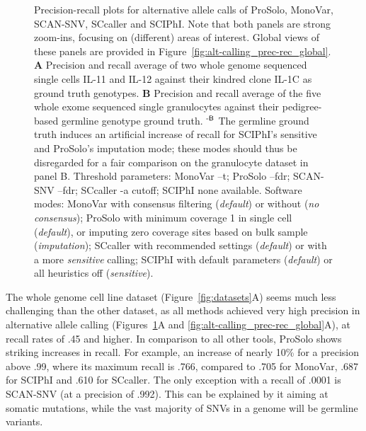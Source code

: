 \documentclass[12pt,inline]{wlscirep}
\begin{document}
\begin{figure}[!tpb]
 \caption{
  Precision-recall plots for alternative allele calls of ProSolo, MonoVar, SCAN-SNV, SCcaller and SCIPhI.
  Note that both panels are strong zoom-ins, focusing on (different) areas of interest.
  Global views of these panels are provided in Figure~\ref{fig:alt-calling_prec-rec_global}.
  \textbf{A} Precision and recall average of two whole genome sequenced single cells IL-11 and IL-12 against their kindred clone IL-1C as ground truth genotypes.
  \textbf{B} Precision and recall average of the five whole exome sequenced single granulocytes against their pedigree-based germline genotype ground truth.\newline
  $^\text{\sffamily-B}$ The germline ground truth induces an artificial increase of recall for SCIPhI's sensitive and ProSolo's imputation mode; these modes should thus be disregarded for a fair comparison on the granulocyte dataset in panel B.\newline \footnotesize
  Threshold parameters:
  MonoVar {\ttfamily --t};
  ProSolo {\ttfamily --fdr};
  SCAN-SNV {\ttfamily --fdr};
  SCcaller {\ttfamily -a cutoff};
  SCIPhI {\ttfamily none available}.
  Software modes:
  MonoVar with consensus filtering ({\itshape default}) or without ({\itshape no consensus});
  ProSolo with minimum coverage 1 in single cell ({\itshape default}), or imputing zero coverage sites based on bulk sample ({\itshape imputation});
  SCcaller with recommended settings ({\itshape default}) or with a more {\itshape sensitive} calling;
  SCIPhI with default parameters ({\itshape default}) or all heuristics off ({\itshape sensitive}).
 }
\label{fig:alt-calling_prec-rec}
\end{figure}

The whole genome cell line dataset (Figure~\ref{fig:datasets}A) seems much less challenging than the other dataset, as all methods achieved very high precision in alternative allele calling (Figures~\ref{fig:alt-calling_prec-rec}A and \ref{fig:alt-calling_prec-rec_global}A), at recall rates of .45 and higher. 
In comparison to all other tools, ProSolo shows striking increases in recall.
For example, an increase of nearly 10\% for a precision above .99, where its maximum recall is .766, compared to .705 for MonoVar, .687 for SCIPhI and .610 for SCcaller.
The only exception with a recall of .0001 is SCAN-SNV (at a precision of .992).
This can be explained by it aiming at somatic mutations, while the vast majority of SNVs in a genome will be germline variants.
\end{document}
